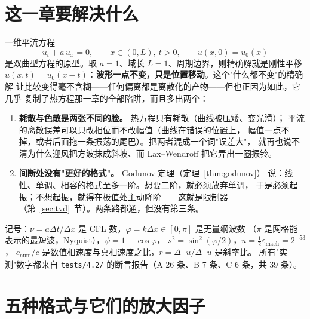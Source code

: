 

\section{这一章要解决什么}

一维平流方程
\begin{equation}
  u_t+a\,u_x=0,\qquad x\in(0,L),\ t>0,\qquad u(x,0)=u_0(x)
  \label{eq:adv}
\end{equation}
是双曲型方程的原型。取 $a=1$、域长 $L=1$、周期边界，则精确解就是刚性平移
$u(x,t)=u_0(x-t)$：\textbf{波形一点不变，只是位置移动}。这个"什么都不变"的精确解
让比较变得毫不含糊——任何偏离都是离散化的产物——但也正因为如此，它几乎
复制了热方程那一章的全部陷阱，而且多出两个：

\begin{enumerate}
  \item \textbf{耗散与色散是两张不同的脸。} 热方程只有耗散（曲线被压矮、变光滑）；
        平流的离散误差可以只改相位而不改幅值（曲线在错误的位置上，
        幅值一点不掉，或者后面拖一条振荡的尾巴）。把两者混成一个词"误差大"，
        就再也说不清为什么迎风把方波抹成斜坡、而 Lax--Wendroff 把它弄出一圈振铃。
  \item \textbf{间断处没有"更好的格式"。} Godunov 定理（定理~\ref{thm:godunov}）
        说：线性、单调、相容的格式至多一阶。想要二阶，就必须放弃单调，
        于是必须起振；不想起振，就得在极值处主动降阶——这就是限制器
        （第~\ref{sec:tvd}~节）。两条路都通，但没有第三条。
\end{enumerate}

记号：$\nu=a\Delta t/\Delta x$ 是 CFL 数，$\varphi=k\Delta x\in[0,\pi]$ 是无量纲波数
（$\pi$ 是网格能表示的最短波，Nyquist），$\psi=1-\cos\varphi$，
$s^2=\sin^2(\varphi/2)$，$u=\frac12\varepsilon_{\text{mach}}=2^{-53}$，
$c_{\text{num}}/c$ 是数值相速度与真相速度之比，$r=\Delta_-u/\Delta_+u$ 是斜率比。
所有"实测"数字都来自 \texttt{tests/4.2/} 的断言报告（A 26 条、B 7 条、C 6 条，共 39 条）。

\section{五种格式与它们的放大因子}

